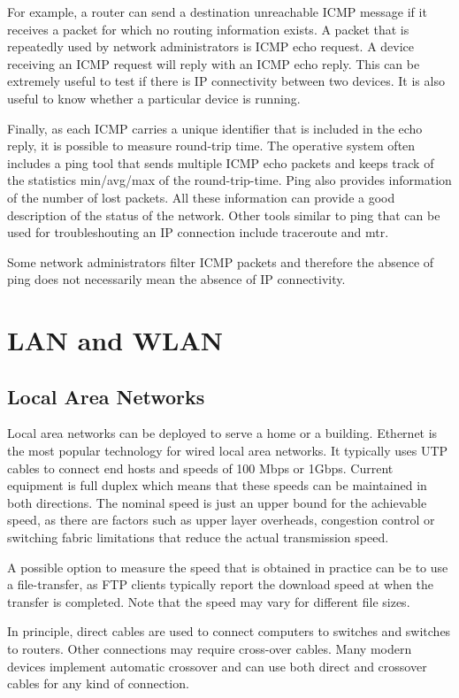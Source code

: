 For example, a router can send a destination unreachable ICMP message if it receives a packet for which no routing information exists.
A packet that is repeatedly used by network administrators is ICMP echo request.
A device receiving an ICMP request will reply with an ICMP echo reply.
This can be extremely useful to test if there is IP connectivity between two devices.
It is also useful to know whether a particular device is running.

Finally, as each ICMP carries a unique identifier that is included in the echo reply, it is possible to measure round-trip time.
The operative system often includes a ping tool that sends multiple ICMP echo packets and keeps track of the statistics min/avg/max of the round-trip-time.
Ping also provides information of the number of lost packets.
All these information can provide a good description of the status of the network.
Other tools similar to ping that can be used for troubleshouting an IP connection include traceroute and mtr.

Some network administrators filter ICMP packets and therefore the absence of ping does not necessarily mean the absence of IP connectivity.

\section{LAN and WLAN}

\subsection{Local Area Networks}

Local area networks can be deployed to serve a home or a building.
Ethernet is the most popular technology for wired local area networks.
It typically uses UTP cables to connect end hosts and speeds of 100 Mbps or 1Gbps.
Current equipment is full duplex which means that these speeds can be maintained in both directions.
The nominal speed is just an upper bound for the achievable speed, as there are factors such as upper layer overheads, congestion control or switching fabric limitations that reduce the actual transmission speed.

A possible option to measure the speed that is obtained in practice can be to use a file-transfer, as FTP clients typically report the download speed at when the transfer is completed.
Note that the speed may vary for different file sizes.

In principle, direct cables are used to connect computers to switches and switches to routers.
Other connections may require cross-over cables.
Many modern devices implement automatic crossover and can use both direct and crossover cables for any kind of connection.

